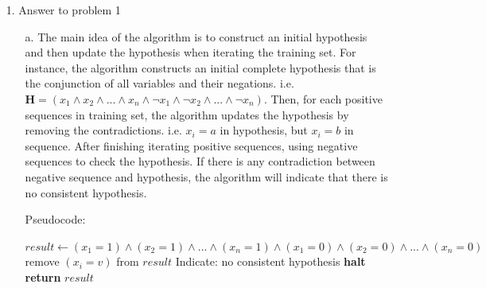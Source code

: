 
\usepackage{amsmath}
\usepackage{algorithm}%
\usepackage{algpseudocode}%
\usepackage{graphicx}
\graphicspath{ {images/} }

\DeclareMathOperator{\proj}{proj}
\newcommand{\vctproj}[2][]{\proj_{\vec{#1}}\vec{#2}}

\oddsidemargin 0in
\evensidemargin 0in
\textwidth 6.5in
\topmargin -0.5in
\textheight 9.0in




\pagestyle{myheadings}  %

\begin{enumerate}
\item[1.] Answer to problem 1
	\begin{enumerate}
	\item[a.] The main idea of the algorithm is to construct an initial hypothesis and then update the hypothesis when iterating the training set. For instance, the algorithm constructs an initial complete hypothesis that is the conjunction of all variables and their negations. i.e. ${\mathbf H} = (x_1 \land x_2 \land ... \land x_n \land \neg x_1 \land \neg x_2 \land ... \land \neg x_n)$. Then, for each positive sequences in training set, the algorithm updates the hypothesis by removing the contradictions. i.e. $x_i = a$ in hypothesis, but $x_i = b$ in sequence. After finishing iterating positive sequences, using negative sequences to check the hypothesis. If there is any contradiction between negative sequence and hypothesis, the algorithm will indicate that there is no consistent hypothesis.
		\begin{algorithm}
		\caption{Pseudocode:}\label{euclid}
		\begin{algorithmic}[1]
		\State $\textit{result} \gets \textit{$(x_1 = 1) \land (x_2 = 1) \land ... \land (x_n = 1) \land (x_1 = 0) \land (x_2 = 0) \land ... \land (x_n = 0)$}$
		\State remove $(x_i = v)$ from $\textit{result}$
		\EndIf
      	\EndFor
		\State Indicate: no consistent hypothesis
		\State \textbf{halt}
		\EndIf
      	\EndFor
      	\State \textbf{return} $\textit{result}$

\end{algorithmic}
\end{algorithm}
\end{enumerate}
\end{enumerate}
